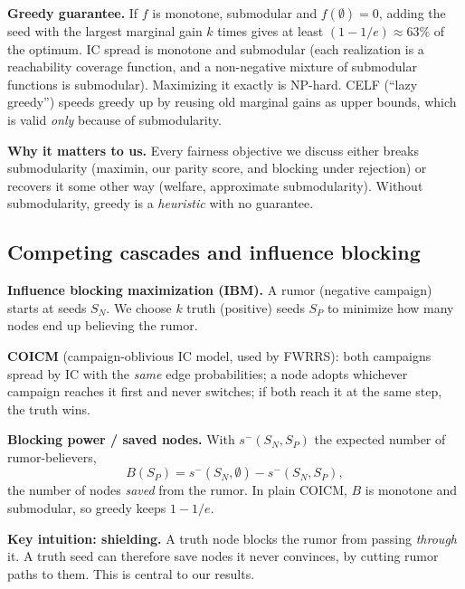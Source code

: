 \documentclass[11pt]{article}
\begin{document}
\textbf{Greedy guarantee.} If $f$ is monotone, submodular and $f(\emptyset)=0$, adding the seed with the largest marginal gain $k$ times gives at least $(1-1/e)\approx 63\%$ of the optimum. IC spread is monotone and submodular (each realization is a reachability coverage function, and a non-negative mixture of submodular functions is submodular). Maximizing it exactly is NP-hard. CELF (``lazy greedy'') speeds greedy up by reusing old marginal gains as upper bounds, which is valid \emph{only} because of submodularity.

\textbf{Why it matters to us.} Every fairness objective we discuss either breaks submodularity (maximin, our parity score, and blocking under rejection) or recovers it some other way (welfare, approximate submodularity). Without submodularity, greedy is a \emph{heuristic} with no guarantee.

\subsection{Competing cascades and influence blocking}
\textbf{Influence blocking maximization (IBM).} A rumor (negative campaign) starts at seeds $S_N$. We choose $k$ truth (positive) seeds $S_P$ to minimize how many nodes end up believing the rumor.

\textbf{COICM} (campaign-oblivious IC model, used by FWRRS): both campaigns spread by IC with the \emph{same} edge probabilities; a node adopts whichever campaign reaches it first and never switches; if both reach it at the same step, the truth wins.

\textbf{Blocking power / saved nodes.} With $s^-(S_N,S_P)$ the expected number of rumor-believers,
\[
B(S_P)=s^-(S_N,\emptyset)-s^-(S_N,S_P),
\]
the number of nodes \emph{saved} from the rumor. In plain COICM, $B$ is monotone and submodular, so greedy keeps $1-1/e$.

\textbf{Key intuition: shielding.} A truth node blocks the rumor from passing \emph{through} it. A truth seed can therefore save nodes it never convinces, by cutting rumor paths to them. This is central to our results.
\end{document}
